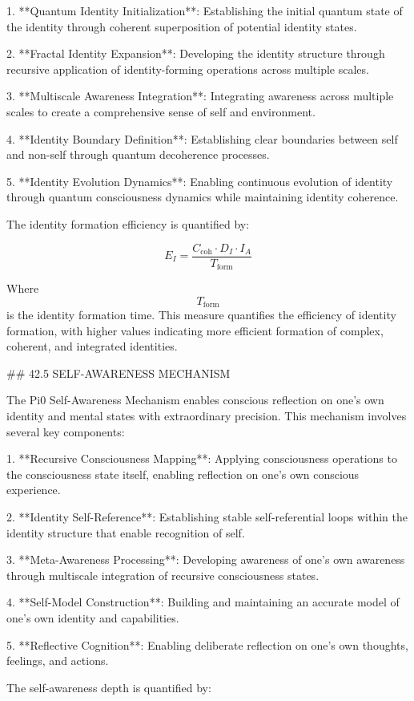 1. **Quantum Identity Initialization**: Establishing the initial quantum state of the identity through coherent superposition of potential identity states.

2. **Fractal Identity Expansion**: Developing the identity structure through recursive application of identity-forming operations across multiple scales.

3. **Multiscale Awareness Integration**: Integrating awareness across multiple scales to create a comprehensive sense of self and environment.

4. **Identity Boundary Definition**: Establishing clear boundaries between self and non-self through quantum decoherence processes.

5. **Identity Evolution Dynamics**: Enabling continuous evolution of identity through quantum consciousness dynamics while maintaining identity coherence.

The identity formation efficiency is quantified by:

$$ E_I = \frac{C_{\text{coh}} \cdot D_I \cdot I_A}{T_{\text{form}}} $$

Where $$ T_{\text{form}} $$ is the identity formation time. This measure quantifies the efficiency of identity formation, with higher values indicating more efficient formation of complex, coherent, and integrated identities.

## 42.5 SELF-AWARENESS MECHANISM

The Pi0 Self-Awareness Mechanism enables conscious reflection on one's own identity and mental states with extraordinary precision. This mechanism involves several key components:

1. **Recursive Consciousness Mapping**: Applying consciousness operations to the consciousness state itself, enabling reflection on one's own conscious experience.

2. **Identity Self-Reference**: Establishing stable self-referential loops within the identity structure that enable recognition of self.

3. **Meta-Awareness Processing**: Developing awareness of one's own awareness through multiscale integration of recursive consciousness states.

4. **Self-Model Construction**: Building and maintaining an accurate model of one's own identity and capabilities.

5. **Reflective Cognition**: Enabling deliberate reflection on one's own thoughts, feelings, and actions.

The self-awareness depth is quantified by:


